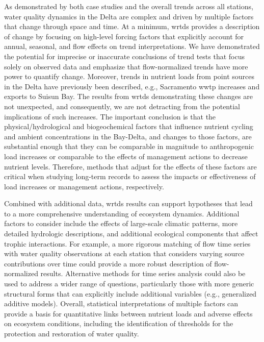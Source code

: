\documentclass[letterpaper,12pt,oneside]{article}\usepackage[]{graphicx}\usepackage[]{color}
\begin{document}
As demonstrated by both case studies and the overall trends across all stations, water quality dynamics in the Delta are complex and driven by multiple factors that change through space and time.  At a minimum, \ac{wrtds} provides a description of change by focusing on high-level forcing factors that explicitly account for annual, seasonal, and flow effects on trend interpretations.  We have demonstrated the potential for imprecise or inaccurate conclusions of trend tests that focus solely on observed data and emphasize that flow-normalized trends have more power to quantify change.  Moreover, trends in nutrient loads from point sources in the Delta have previously been described, e.g., Sacramento \ac{wwtp} increases\cite{Jassby08} and exports to Suisun Bay\cite{Novick14}. The results from \ac{wrtds} demonstrating these changes are not unexpected, and consequently, we are not detracting from the potential implications of such increases. The important conclusion is that the physical/hydrological and biogeochemical factors that influence nutrient cycling and ambient concentrations in the Bay-Delta, and changes to those factors, are substantial enough that they can be comparable in magnitude to anthropogenic load increases or comparable to the effects of management actions to decrease nutrient levels. Therefore, methods that adjust for the effects of these factors are critical when studying long-term records to assess the impacts or effectiveness of load increases or management actions, respectively.

Combined with additional data, \ac{wrtds} results can support hypotheses that lead to a more comprehensive understanding of ecosystem dynamics. Additional factors to consider include the effects of large-scale climatic patterns, more detailed hydrologic descriptions, and additional ecological components that affect trophic interactions.  For example, a more rigorous matching of flow time series with water quality observations at each station that considers varying source contributions over time could provide a more robust description of flow-normalized results.  Alternative methods for time series analysis could also be used to address a wider range of questions, particularly those with more generic structural forms that can explicitly include additional variables (e.g., generalized additive models).\cite{Beck17}  Overall, statistical interpretations of multiple factors can provide a basis for quantitative links between nutrient loads and adverse effects on ecosystem conditions, including the identification of thresholds for the protection and restoration of water quality. 
\end{document}
